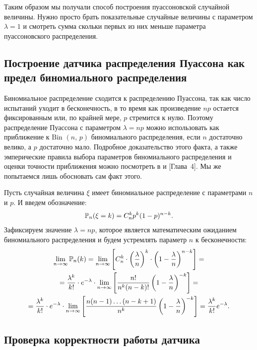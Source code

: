 Таким образом мы получали способ построения пуассоновской случайной величины. Нужно просто брать показательные случайные величины с параметром $\lambda = 1$ и смотреть сумма скольки первых из них меньше параметра пуассоновского распределения.


\subsection{Построение датчика распределения Пуассона как предел биномиального распределения}

Биномиальное распределение сходится к распределению Пуассона, так как число испытаний уходит в бесконечность, в то время как произведение $np$ остается фиксированным или, по крайней мере, $p$ стремится к нулю. Поэтому распределение Пуассона с параметром $\lambda = np$ можно использовать как приближение к $\mbox{Bin }(n,\,p)$ биномиального распределения, если $n$ достаточно велико, а $p$ достаточно мало. Подробное доказательство этого факта, а также эмперические правила выбора параметров биномиального распределения и оценки точности приближения можно посмотреть в \cite{counts_control_charts} и \cite{novak}[Глава~4]. Мы же попытаемся лишь обосновать сам факт этого.

Пусть случайная величина $\xi$ имеет биномиальное распределение с параметрами $n$ и $p$. И введем обозначение:
$$
        \mathbb{P}_n(\xi = k)
        =
        C_n^k p^k (1 - p)^{n-k}.
$$
Зафиксируем значение $\lambda = np$, которое является математическим ожиданием биномиального распределения и будем устремлять параметр $n$ к бесконечности:
\begin{multline*}
        \lim_{n\to\infty}\mathbb{P}_n(k)
        =
        \lim_{n\to\infty}\left[C_n^k\cdot \left(\frac{\lambda}{n}\right)^k\cdot\left(1 - \frac\lambda n \right)^{n-k}\right]
        =\\=
        \frac{\lambda^k}{k!} \cdot e^{-\lambda} \cdot \lim_{n\to\infty}\left[ \frac{n!}{n^k(n-k)!} \left( 1 - \frac\lambda n \right)^{-k} \right]
        = \\ =
        \frac{\lambda^k}{k!} \cdot e^{-\lambda} \cdot \lim_{n\to\infty}\left[ \frac{n(n-1)\ldots(n-k+1)}{n^k} \left( 1 - \frac\lambda n \right)^{-k} \right]
        =
        \frac{\lambda^k}{k!} e^{-\lambda}.
\end{multline*}

\subsection{Проверка корректности работы датчика}

